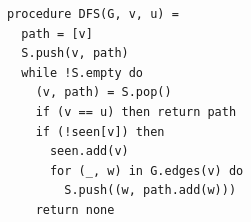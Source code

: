 \begin{lstlisting}[language=imperative]
procedure DFS(G, v, u) = 
  path = [v] 
  S.push(v, path)
  while !S.empty do
    (v, path) = S.pop()
    if (v == u) then return path
    if (!seen[v]) then
      seen.add(v)
      for (_, w) in G.edges(v) do 
        S.push((w, path.add(w)))
    return none
\end{lstlisting}